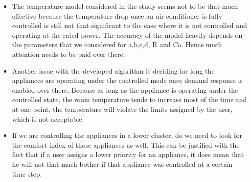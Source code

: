 \documentclass[12pt,a4paper]{article}
\begin{document}
\begin{itemize}
    \item The temperature model considered in the study seems not to be that much effective because the temperature drop once an air conditioner is fully controlled is still not that significant to the case where it is not controlled and operating at the rated power. The accuracy of the model heavily depends on the parameters that we considered for a,b,c,d, R and Ca. Hence much attention needs to be paid over there.
    
    \item Another issue with the developed algorithm is deciding for long the appliances are operating under the controlled mode once demand response is enabled over there. Because as long as the appliance is operating under the controlled state, the room temperature tends to increase most of the time and at one point, the temperature will violate the limits assigned by the user, which is not acceptable.
    
    \item If we are controlling the appliances in a lower cluster, do we need to look for the comfort index of those appliances as well. This can be justified with the fact that if a user assigns a lower priority for an appliance, it does mean that he will not that much bother if that appliance was controlled at a certain time step.
\end{itemize}




\end{document}
